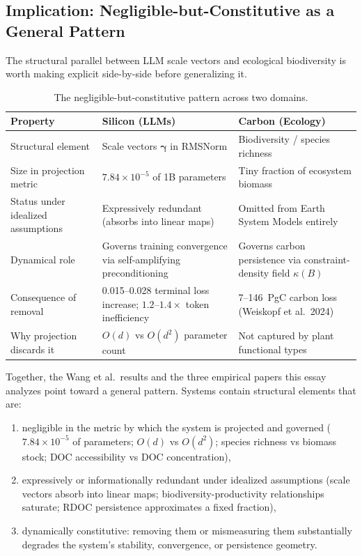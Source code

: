 \documentclass[12pt]{article}
\begin{document}
\subsection{Implication: Negligible-but-Constitutive as a General Pattern}

The structural parallel between LLM scale vectors and ecological biodiversity is worth
making explicit side-by-side before generalizing it.

\begin{table}[h]
\centering
\caption{The negligible-but-constitutive pattern across two domains.}
\label{tab:nbc}
\renewcommand{\arraystretch}{1.3}
\begin{tabular}{@{}p{3.8cm}p{4.8cm}p{4.6cm}@{}}
\toprule
\textbf{Property} & \textbf{Silicon (LLMs)} & \textbf{Carbon (Ecology)} \\
\midrule
Structural element
  & Scale vectors $\boldsymbol{\gamma}$ in RMSNorm
  & Biodiversity / species richness \\
Size in projection metric
  & $7.84\times 10^{-5}$ of 1B parameters
  & Tiny fraction of ecosystem biomass \\
Status under idealized assumptions
  & Expressively redundant (absorbs into linear maps)
  & Omitted from Earth System Models entirely \\
Dynamical role
  & Governs training convergence via self-amplifying preconditioning
  & Governs carbon persistence via constraint-density field $\kappa(B)$ \\
Consequence of removal
  & 0.015--0.028 terminal loss increase; $1.2$--$1.4\times$ token inefficiency
  & 7--146~PgC carbon loss (Weiskopf et al.\ 2024) \\
Why projection discards it
  & $O(d)$ vs $O(d^2)$ parameter count
  & Not captured by plant functional types \\
\bottomrule
\end{tabular}
\end{table}

Together, the Wang et al.\ results and the three empirical papers this essay analyzes
point toward a general pattern. Systems contain structural elements that are:

\begin{enumerate}
\item negligible in the metric by which the system is projected and governed ($7.84\times
10^{-5}$ of parameters; $O(d)$ vs $O(d^2)$; species richness vs biomass stock; DOC
accessibility vs DOC concentration),
\item expressively or informationally redundant under idealized assumptions (scale
vectors absorb into linear maps; biodiversity-productivity relationships saturate;
RDOC persistence approximates a fixed fraction),
\item dynamically constitutive: removing them or mismeasuring them substantially
degrades the system's stability, convergence, or persistence geometry.
\end{enumerate}
\end{document}
